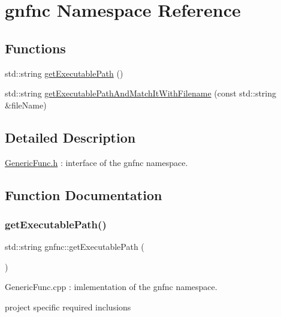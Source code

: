 \hypertarget{namespacegnfnc}{}\section{gnfnc Namespace Reference}
\label{namespacegnfnc}
\subsection*{Functions}
\begin{DoxyCompactItemize}
\item 
std\+::string \mbox{\hyperlink{namespacegnfnc_a83d25b352dc66d2317f398c5a3c67f81}{get\+Executable\+Path}} ()
\item 
std\+::string \mbox{\hyperlink{namespacegnfnc_adf0284ac1df7768c93180ada79054488}{get\+Executable\+Path\+And\+Match\+It\+With\+Filename}} (const std\+::string \&file\+Name)
\end{DoxyCompactItemize}


\subsection{Detailed Description}
\mbox{\hyperlink{_generic_func_8h_source}{Generic\+Func.\+h}} \+: interface of the gnfnc namespace. 

\subsection{Function Documentation}
\mbox{\label{namespacegnfnc_a83d25b352dc66d2317f398c5a3c67f81}} 
\subsubsection{\texorpdfstring{get\+Executable\+Path()}{getExecutablePath()}}
{\footnotesize\ttfamily std\+::string gnfnc\+::get\+Executable\+Path (\begin{DoxyParamCaption}{ }\end{DoxyParamCaption})}

Generic\+Func.\+cpp \+: imlementation of the gnfnc namespace.

project specific required inclusions \mbox{\label{namespacegnfnc_adf0284ac1df7768c93180ada79054488}} 
